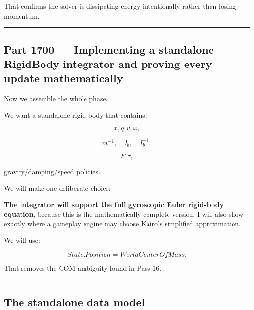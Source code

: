 That confirms the solver is dissipating energy intentionally rather than losing momentum.

\begin{center}\rule{0.5\linewidth}{0.5pt}\end{center}

\subsection{Part 1700 --- Implementing a standalone RigidBody integrator and proving every update mathematically}\label{06-engine-ii-ch039-part-1700-implementing-a-standalone-rigidbody-integrator-and-proving-every-update-mathematically}

\hypertarget{06-engine-ii-ch039-part-1700-implementing-a-standalone-rigidbody-integrator-and-proving-every-update-mathematically}{}

Now we assemble the whole phase.

We want a standalone rigid body that contains:

\[
x,q,v,\omega,
\]

\[
m^{-1},
\quad
I_b,
\quad
I_b^{-1},
\]

\[
F,\tau,
\]

gravity/damping/speed policies.

We will make one deliberate choice:

\textbf{The integrator will support the full gyroscopic Euler rigid-body equation}, because this is the mathematically complete version. I will also show exactly where a gameplay engine may choose Kairo's simplified approximation.

We will use:

\[
State.Position
=
WorldCenterOfMass.
\]

That removes the COM ambiguity found in Pass 16.

\begin{center}\rule{0.5\linewidth}{0.5pt}\end{center}

\subsection{The standalone data model}\label{06-engine-ii-ch039-the-standalone-data-model}

\hypertarget{06-engine-ii-ch039-the-standalone-data-model}{}

